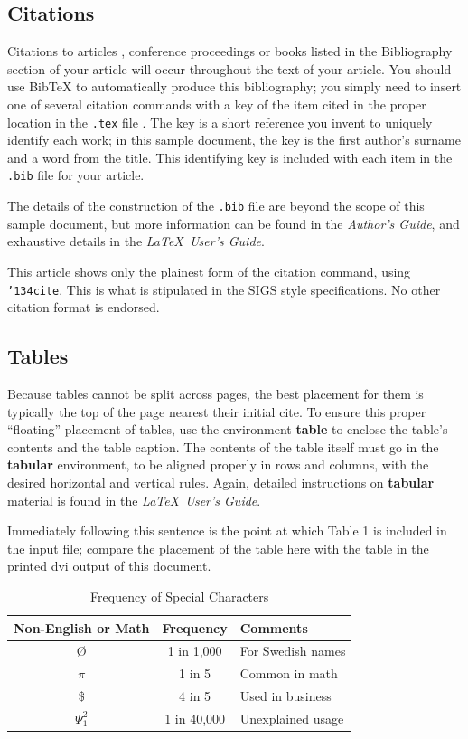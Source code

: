 \documentclass{vldb}
\begin{document}
\subsection{Citations}
Citations to articles \cite{bowman:reasoning, clark:pct, braams:babel, herlihy:methodology},
conference
proceedings \cite{clark:pct} or books \cite{salas:calculus, Lamport:LaTeX} listed
in the Bibliography section of your
article will occur throughout the text of your article.
You should use BibTeX to automatically produce this bibliography;
you simply need to insert one of several citation commands with
a key of the item cited in the proper location in
the \texttt{.tex} file \cite{Lamport:LaTeX}.
The key is a short reference you invent to uniquely
identify each work; in this sample document, the key is
the first author's surname and a
word from the title.  This identifying key is included
with each item in the \texttt{.bib} file for your article.

The details of the construction of the \texttt{.bib} file
are beyond the scope of this sample document, but more
information can be found in the \textit{Author's Guide},
and exhaustive details in the \textit{\LaTeX\ User's
Guide}\cite{Lamport:LaTeX}.

This article shows only the plainest form
of the citation command, using \texttt{{\char'134}cite}.
This is what is stipulated in the SIGS style specifications.
No other citation format is endorsed.

\subsection{Tables}
Because tables cannot be split across pages, the best
placement for them is typically the top of the page
nearest their initial cite.  To
ensure this proper ``floating'' placement of tables, use the
environment \textbf{table} to enclose the table's contents and
the table caption.  The contents of the table itself must go
in the \textbf{tabular} environment, to
be aligned properly in rows and columns, with the desired
horizontal and vertical rules.  Again, detailed instructions
on \textbf{tabular} material
is found in the \textit{\LaTeX\ User's Guide}.

Immediately following this sentence is the point at which
Table 1 is included in the input file; compare the
placement of the table here with the table in the printed
dvi output of this document.

\begin{table}
\centering
\caption{Frequency of Special Characters}
\begin{tabular}{|c|c|l|} \hline
Non-English or Math&Frequency&Comments\\ \hline
\O & 1 in 1,000& For Swedish names\\ \hline
$\pi$ & 1 in 5& Common in math\\ \hline
\$ & 4 in 5 & Used in business\\ \hline
$\Psi^2_1$ & 1 in 40,000& Unexplained usage\\
\hline\end{tabular}
\end{table}
\end{document}
